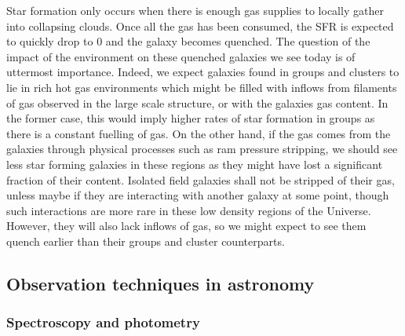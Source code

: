 Star formation only occurs when there is enough gas supplies to locally gather into collapsing clouds. Once all the gas has been consumed, the SFR is expected to quickly drop to $0$ and the galaxy becomes quenched. The question of the impact of the environment on these quenched galaxies we see today is of uttermost importance. Indeed, we expect galaxies found in groups and clusters to lie in rich hot gas environments which might be filled with inflows from filaments of gas observed in the large scale structure, or with the galaxies gas content. In the former case, this would imply higher rates of star formation in groups as there is a constant fuelling of gas. On the other hand, if the gas comes from the galaxies through physical processes such as ram pressure stripping, we should see less star forming galaxies in these regions as they might have lost a significant fraction of their content. Isolated field galaxies shall not be stripped of their gas, unless maybe if they are interacting with another galaxy at some point, though such interactions are more rare in these low density regions of the Universe. However, they will also lack inflows of gas, so we might expect to see them quench earlier than their groups and cluster counterparts. 




\subsection{Observation techniques in astronomy}
\label{subsec:diffPhotSpec}

\subsubsection{Spectroscopy and photometry}
\label{subsubsec:photo_data}

